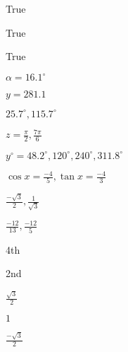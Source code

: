 \documentclass{article}
\begin{document}
\begin{enumerate}[label=Q\arabic*)]
  \item
        \begin{enumerate*}[label=\alph*)]
          \item
          \begin{enumerate*}
            \item[ii)] True 
            \item[iv)] True 
            \item[v)] True 
          \end{enumerate*}
          \item 
          \begin{enumerate*}
            \item $\alpha = 16.1^{\circ}$
            \item $y = 281.1$
          \end{enumerate*}
        \end{enumerate*}
  \item
        \begin{enumerate*}[label=\alph*)]
          \item $25.7^{\circ}, 115.7^{\circ}$
          \item $z = \frac{\pi}{2}, \frac{7\pi}{6}$
          \item $y^{\circ} = 48.2^{\circ}, 120^{\circ}, 240^{\circ}, 311.8^{\circ}$
        \end{enumerate*}
  \item 
        \begin{enumerate*}[label=\alph*)]
          \item $\cos x = \frac{-4}{5}, \tan x = \frac{-4}{3}$
          \item $\frac{-\sqrt{3}}{2}, \frac{1}{\sqrt{3}}$
          \item $\frac{-12}{13}, \frac{-12}{5}$
        \end{enumerate*}
  \item[Q6)]
        \begin{enumerate*}[label=\roman*)]
          \item 4th
          \item 2nd
        \end{enumerate*}
  \item[Q7)]
        \begin{enumerate*}[label=\roman*)]
          \item $\frac{\sqrt{3}}{2}$
          \item $1$
          \item $\frac{-\sqrt{3}}{2}$

\end{enumerate*}
\end{enumerate}
\end{document}
